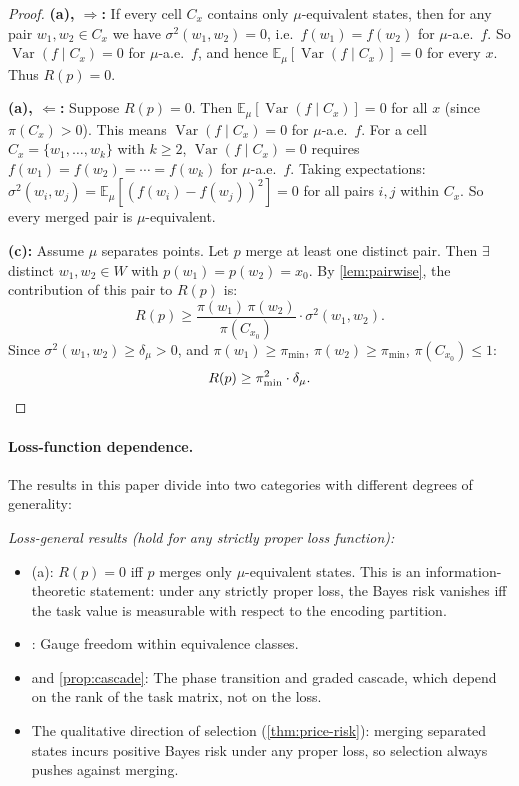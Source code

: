 \documentclass[12pt]{article}
\newcommand{\dmu}{\delta_\mu}
\newcommand{\pimin}{\pi_{\min}}
\newcommand{\sigmasq}{\sigma^2}
\newcommand{\E}{\mathbb{E}}
\newcommand{\Var}{\operatorname{Var}}
\begin{document}
\begin{proof}
\textbf{(a), $\Longrightarrow$:} If every cell $C_x$ contains only $\mu$-equivalent states, then for any pair $w_1, w_2 \in C_x$ we have $\sigmasq(w_1, w_2) = 0$, i.e.\ $f(w_1) = f(w_2)$ for $\mu$-a.e.\ $f$. So $\Var(f \mid C_x) = 0$ for $\mu$-a.e.\ $f$, and hence $\E_\mu[\Var(f \mid C_x)] = 0$ for every $x$. Thus $R(p) = 0$.

\textbf{(a), $\Longleftarrow$:} Suppose $R(p) = 0$. Then $\E_\mu[\Var(f \mid C_x)] = 0$ for all $x$ (since $\pi(C_x) > 0$). This means $\Var(f \mid C_x) = 0$ for $\mu$-a.e.\ $f$. For a cell $C_x = \{w_1, \ldots, w_k\}$ with $k \ge 2$, $\Var(f \mid C_x) = 0$ requires $f(w_1) = f(w_2) = \cdots = f(w_k)$ for $\mu$-a.e.\ $f$. Taking expectations: $\sigmasq(w_i, w_j) = \E_\mu[(f(w_i) - f(w_j))^2] = 0$ for all pairs $i, j$ within $C_x$. So every merged pair is $\mu$-equivalent.

\textbf{(c):} Assume $\mu$ separates points. Let $p$ merge at least one distinct pair. Then $\exists$ distinct $w_1, w_2 \in W$ with $p(w_1) = p(w_2) = x_0$. By \cref{lem:pairwise}, the contribution of this pair to $R(p)$ is:
\begin{equation}\label{eq:pair-contribution}
R(p) \ge \frac{\pi(w_1)\,\pi(w_2)}{\pi(C_{x_0})} \cdot \sigmasq(w_1, w_2).
\end{equation}
Since $\sigmasq(w_1, w_2) \ge \dmu > 0$, and $\pi(w_1) \ge \pimin$, $\pi(w_2) \ge \pimin$, $\pi(C_{x_0}) \le 1$:
\[
R(p) \ge \pimin^2 \cdot \dmu. \qedhere
\]
\end{proof}

\paragraph{Loss-function dependence.}\label{rem:loss-dependence}
The results in this paper divide into two categories with different degrees of generality:

\emph{Loss-general results (hold for any strictly proper loss function):}
\begin{itemize}
\item {}(a): $R(p) = 0$ iff $p$ merges only $\mu$-equivalent states. This is an information-theoretic statement: under any strictly proper loss, the Bayes risk vanishes iff the task value is measurable with respect to the encoding partition.
\item {}: Gauge freedom within equivalence classes.
\item {} and \cref{prop:cascade}: The phase transition and graded cascade, which depend on the rank of the task matrix, not on the loss.
\item The qualitative direction of selection (\cref{thm:price-risk}): merging separated states incurs positive Bayes risk under any proper loss, so selection always pushes against merging.
\end{itemize}
\end{document}
